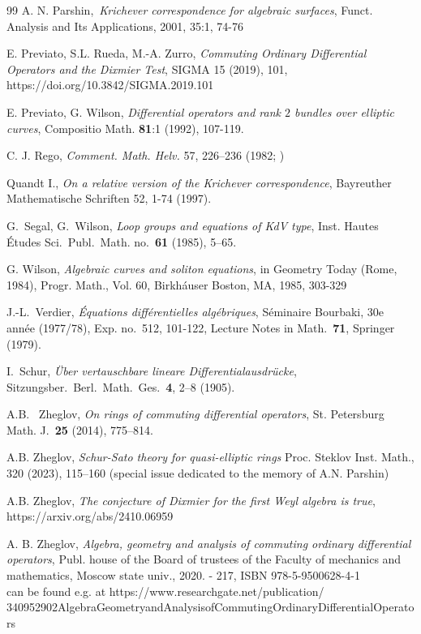 \documentclass[11pt]{article}
\theoremstyle{definition}
\theoremstyle{plain}
\numberwithin{equation}{section}
\begin{document}
\begin{thebibliography}{99}
 A. N. Parshin,~{\em Krichever correspondence for algebraic surfaces}, Funct. Analysis and Its Applications, 2001, 35:1, 74-76



 E. Previato, S.L. Rueda, M.-A. Zurro, {\it Commuting Ordinary Differential Operators and the Dixmier Test},  SIGMA 15 (2019), 101, https://doi.org/10.3842/SIGMA.2019.101 

 E. Previato, G. Wilson, \textit{Differential operators and rank $2$
 bundles over elliptic curves}, Compositio Math. \textbf{81}:1 (1992), 107-119.
 
 C. J. Rego, {\it Comment. Math. Helv.} 57, 226--236 (1982; )


 Quandt I., {\em On a relative version of the Krichever correspondence}, Bayreuther Mathematische Schriften 52, 1-74 (1997).

 G.~Segal, G.~Wilson, \emph{Loop groups and equations of KdV type},  Inst. Hautes \'Etudes Sci.~Publ.~Math. no.~\textbf{61} (1985), 5--65.

 G. Wilson, {\it Algebraic curves and soliton equations}, in Geometry Today (Rome, 1984), Progr. Math., Vol. 60, Birkh\'auser Boston, MA, 1985, 303-329

 J.-L.~Verdier, \emph{\'Equations diff\'erentielles alg\'ebriques}, S\'eminaire Bourbaki, 30e ann\'ee (1977/78), Exp. no.~512, 101-122, Lecture Notes in Math.~\textbf{71}, Springer (1979).


 I.~Schur, \emph{\"Uber vertauschbare lineare Differentialausdr\"ucke},
Sitzungsber.~Berl.~Math.~Ges.~\textbf{4}, 2--8 (1905).

 A.B. ~Zheglov, \textit{On rings of commuting differential operators},
St. Petersburg Math. J.~\textbf{25} (2014),  775--814.

 A.B. Zheglov, {\it Schur-Sato theory for quasi-elliptic rings} Proc. Steklov Inst. Math., 320 (2023), 115–160 (special issue dedicated to the memory of A.N. Parshin)

 A.B. Zheglov, {\it The conjecture of Dixmier for the first Weyl algebra is true}, https://arxiv.org/abs/2410.06959


 A. B. Zheglov, {\em Algebra, geometry and analysis of commuting ordinary differential operators}, Publ. house of the Board of trustees of the Faculty of mechanics and mathematics, Moscow state univ., 2020. - 217,  ISBN 978-5-9500628-4-1\\ 
can be found e.g. at 
https://www.researchgate.net/publication/\\
340952902AlgebraGeometryandAnalysisofCommutingOrdinaryDifferentialOperators 







\end{thebibliography}
\end{document}
